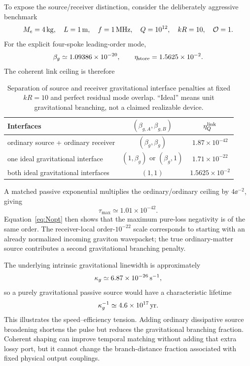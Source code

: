 To expose the source/receiver distinction, consider the deliberately aggressive benchmark
\begin{equation}
M_e=4\,{\rm kg},\quad
L=1\,{\rm m},\quad
f=1\,{\rm MHz},\quad
Q=10^{12},\quad
kR=10,\quad
\mathcal O=1.
\end{equation}
For the explicit four-spoke leading-order mode,
\begin{equation}
\beta_g\simeq1.09386\times10^{-20},
\qquad
\eta_{\rm store}=1.5625\times10^{-2}.
\end{equation}
The coherent link ceiling is therefore
\begin{table}[h]
\centering
\begin{tabular}{lcc}
\toprule
Interfaces & $(\beta_{g,A},\beta_{g,B})$ & $\eta_Q^{\rm link}$ \\
\midrule
ordinary source + ordinary receiver & $(\beta_g,\beta_g)$ & $1.87\times10^{-42}$ \\
one ideal gravitational interface & $(1,\beta_g)$ or $(\beta_g,1)$ & $1.71\times10^{-22}$ \\
both ideal gravitational interfaces & $(1,1)$ & $1.5625\times10^{-2}$ \\
\bottomrule
\end{tabular}
\caption{Separation of source and receiver gravitational interface penalties at fixed $kR=10$ and perfect residual mode overlap. ``Ideal'' means unit gravitational branching, not a claimed realizable device.}
\label{tab:benchmark}
\end{table}
A matched passive exponential multiplies the ordinary/ordinary ceiling by $4\ee^{-2}$, giving
\begin{equation}
\tau_{\max}\simeq1.01\times10^{-42}.
\end{equation}
Equation~\eqref{eq:Nopt} then shows that the maximum pure-loss negativity is of the same order. The receiver-local order-$10^{-22}$ scale corresponds to starting with an already normalized incoming graviton wavepacket; the true ordinary-matter source contributes a second gravitational branching penalty.

The underlying intrinsic gravitational linewidth is approximately
\begin{equation}
\kappa_g\simeq6.87\times10^{-26}\,{\rm s}^{-1},
\end{equation}
so a purely gravitational passive source would have a characteristic lifetime
\begin{equation}
\kappa_g^{-1}\simeq4.6\times10^{17}\,{\rm yr}.
\end{equation}
This illustrates the speed--efficiency tension. Adding ordinary dissipative source broadening shortens the pulse but reduces the gravitational branching fraction. Coherent shaping can improve temporal matching without adding that extra lossy port, but it cannot change the branch-distance fraction associated with fixed physical output couplings.

